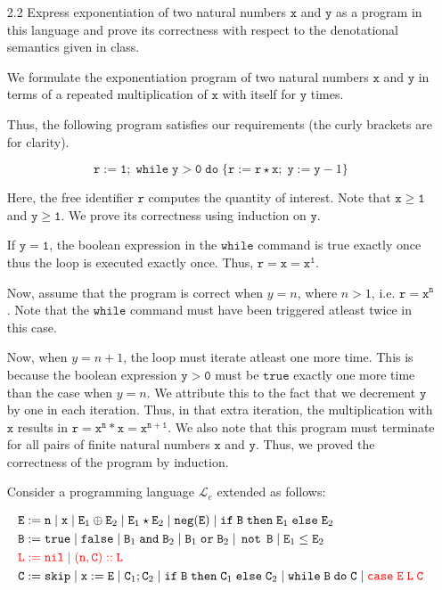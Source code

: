\documentclass[a4paper,10pt]{article}
\newcommand{\E}{\mathtt{E}}
\newcommand{\B}{\mathtt{B}}
\newcommand{\C}{\mathtt{C}}
\newcommand{\LL}{\mathtt{L}}
\newcommand{\true}{\mathtt{true}}
\newcommand{\false}{\mathtt{false}}
\newcommand{\andsym}{\mathtt{and}}
\newcommand{\orsym}{\mathtt{or}}
\newcommand{\notsym}{\mathop{\mathtt{not}}}
\newcommand{\ifsym}{\mathtt{if}}
\newcommand{\then}{\mathtt{then}}
\newcommand{\elsesym}{\mathtt{else}}
\newcommand{\whilesym}{\mathtt{while}}
\newcommand{\dosym}{\mathtt{do}}
\newcommand{\skipsym}{\mathtt{skip}}
\newcommand{\nil}{\mathtt{nil}}
\newcommand{\case}{\mathtt{case}}
\newcommand{\negation}{\mathtt{neg}}
\newcommand{\question}[1]
{\color{DarkBlue}#1 \color{Black} \newline}
\begin{document}
\begin{enumerate}
\question{
\item[2.2] Express exponentiation of two natural numbers $\mathtt{x}$ and $\mathtt{y}$ as a program
in this language and prove its correctness with respect to the denotational semantics given in class.
}

We formulate the exponentiation program of two natural numbers $\mathtt{x}$ and
$\mathtt{y}$ in terms of a repeated multiplication of $\mathtt{x}$ with itself
for $\mathtt{y}$ times.

Thus, the following program satisfies our requirements (the curly brackets are
for clarity).

$$ \mathtt{r} := \mathtt{1}; \; \whilesym \; \mathtt{y} > \mathtt{0} \; \dosym
\; \{ \mathtt{r} := \mathtt{r} \star \mathtt{x} ; \; \mathtt{y} := \mathtt{y} -
1 \} $$

Here, the free identifier $\mathtt{r}$ computes the quantity of interest. Note
that $\mathtt{x} \geq \mathtt{1} $ and $\mathtt{y} \geq \mathtt{1}$. We prove
its correctness using induction on $\mathtt{y}$.

If $\mathtt{y} = \mathtt{1}$, the boolean expression in the $\whilesym$ command
is true exactly once thus the loop is executed exactly once. 
Thus, $\mathtt{r} = \mathtt{x} = \mathtt{x}^{\mathtt{1}} $.

Now, assume that the program is correct when $y = n$, where $n > 1$, i.e.
$\mathtt{r} = \mathtt{x}^{\mathtt{n}}$. Note that the $\whilesym$ command must have been 
triggered atleast twice in this case. 

Now, when $y = n + 1$, the loop must iterate atleast one more time. This is
because the boolean expression $\mathtt{y} > \mathtt{0}$ must
be $\true$ exactly one more time than the case when  $y = n$. We attribute
this to the fact that we decrement $\mathtt{y}$ by one in each iteration.
Thus, in that extra iteration, the multiplication with $\mathtt{x}$ results in
$\mathtt{r} = \mathtt{x}^{\mathtt{n}}  * \mathtt{x} =
\mathtt{x}^{\mathtt{n+1}}$. 
We also note that this program must terminate for all pairs of finite natural
numbers $\mathtt{x}$ and $\mathtt{y}$. Thus, we proved the correctness of the 
program by induction.

\question{
Consider a programming language $\mathcal{L}_e$ extended as follows:

\begin{align*}
& \E := \mathtt{n} \; | \; \mathtt{x} \; | \; \E_1 \oplus \E_2 \; | \; \E_1 \star \E_2 \; | \; \negation(\E) \; | \; \ifsym \; \B \; \then \; \E_1 \; \elsesym \; \E_2 \\
& \B := \true \; | \; \false \; | \; \B_1 \; \andsym \; \B_2 \; | \; \B_1 \; \orsym \; \B_2 \; | \; \notsym \; \B \; | \; \E_1 \leq \E_2 \\
& {\color{red} \LL := \nil \; | \; (\mathtt{n},\C)::\LL} \\
& \C := \skipsym \; | \; \mathtt{x} := \E \; | \; \C_1 ; \C_2 \; | \; \ifsym \; \B \; \then \; \C_1 \; \elsesym \; \C_2 \; | \; \whilesym \; \B \; \dosym \; \C \; | \; {\color{red} \case \; \E \; \LL \; \C}
\end{align*}

}
\end{enumerate}
\end{document}
